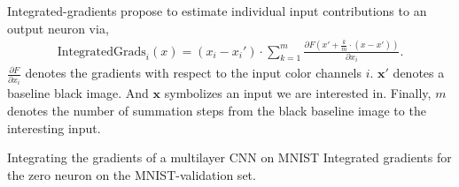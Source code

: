 \documentclass{beamer}
\begin{document}
    \begin{frame}{Integrated-gradients}
    \cite{sundararajan2017axiomatic} propose to estimate individual input contributions
    to an output neuron via,
    \begin{align}
      \text{IntegratedGrads}_i(x) = (x_i - x_i') \cdot
      \sum_{k=1}^m \frac{\partial F (x' + \frac{k}{m} \cdot (x - x'))}{\partial x_i}. 
    \end{align}
    $\frac{\partial F}{\partial x_i}$ denotes the gradients with respect to the input color channels $i$.
    $\mathbf{x}'$ denotes a baseline black image. And $\mathbf{x}$ symbolizes an input we are interested in.
    Finally, $m$ denotes the number of summation steps from the black baseline image to the interesting input.
    \end{frame}


    \begin{frame}{Integrating the gradients of a multilayer CNN on MNIST}
      Integrated gradients for the zero neuron on the MNIST-validation set.
      \begin{figure}
      
      \end{figure}
    \end{frame}
\end{document}
